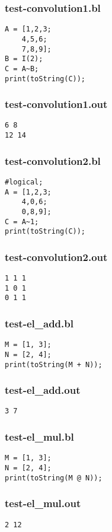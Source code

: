 \subsubsection{test-convolution1.bl}
\begin{lstlisting}
A = [1,2,3;
    4,5,6;
    7,8,9];
B = I(2);
C = A~B;
print(toString(C));
\end{lstlisting}
\subsubsection{test-convolution1.out}
\begin{lstlisting}
6 8
12 14\end{lstlisting}
\subsubsection{test-convolution2.bl}
\begin{lstlisting}
#logical;
A = [1,2,3;
    4,0,6;
    0,8,9];
C = A~1;
print(toString(C));
\end{lstlisting}
\subsubsection{test-convolution2.out}
\begin{lstlisting}
1 1 1
1 0 1
0 1 1
\end{lstlisting}
\subsubsection{test-el\_add.bl}
\begin{lstlisting}
M = [1, 3];
N = [2, 4];
print(toString(M + N));
\end{lstlisting}
\subsubsection{test-el\_add.out}
\begin{lstlisting}
3 7\end{lstlisting}
\subsubsection{test-el\_mul.bl}
\begin{lstlisting}
M = [1, 3];
N = [2, 4];
print(toString(M @ N));\end{lstlisting}
\subsubsection{test-el\_mul.out}
\begin{lstlisting}
2 12\end{lstlisting}
